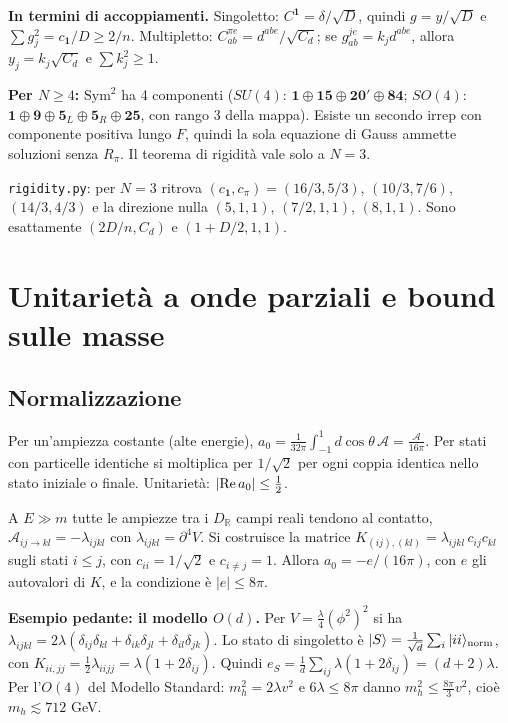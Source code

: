 \documentclass[11pt,a4paper]{article}
\numberwithin{equation}{section}
\theoremstyle{remark}
\newcommand{\R}{\mathbb{R}}
\begin{document}
\textbf{In termini di accoppiamenti.} Singoletto: $C^{\mathbf1}=\delta/\sqrt D$, quindi $g=y/\sqrt D$ e $\sum g_j^2=c_{\mathbf1}/D\ge2/n$. Multipletto: $C^{\pi e}_{ab}=d^{abe}/\sqrt{C_d}$; se $g^{je}_{ab}=k_jd^{abe}$, allora $y_j=k_j\sqrt{C_d}$ e $\sum k_j^2\ge1$.

\textbf{Per $N\ge4$:} $\mathrm{Sym}^2$ ha 4 componenti ($SU(4)$: $\mathbf1\oplus\mathbf{15}\oplus\mathbf{20}'\oplus\mathbf{84}$; $SO(4)$: $\mathbf1\oplus\mathbf9\oplus\mathbf5_L\oplus\mathbf5_R\oplus\mathbf{25}$, con rango 3 della mappa). Esiste un secondo irrep con componente positiva lungo $F$, quindi la sola equazione di Gauss ammette soluzioni senza $R_\pi$. Il teorema di rigidità vale solo a $N=3$.

\begin{verifica}
\texttt{rigidity.py}: per $N=3$ ritrova $(c_{\mathbf1},c_\pi)=(16/3,5/3)$, $(10/3,7/6)$, $(14/3,4/3)$ e la direzione nulla $(5,1,1)$, $(7/2,1,1)$, $(8,1,1)$. Sono esattamente $(2D/n,C_d)$ e $(1+D/2,1,1)$.
\end{verifica}

\section{Unitarietà a onde parziali e bound sulle masse}
\label{sec:unit}

\subsection{Normalizzazione}

Per un'ampiezza costante (alte energie), $a_0=\frac{1}{32\pi}\int_{-1}^1d\cos\theta\,\mathcal A=\frac{\mathcal A}{16\pi}$. Per stati con particelle identiche si moltiplica per $1/\sqrt2$ per ogni coppia identica nello stato iniziale o finale. Unitarietà: $|{\rm Re}\,a_0|\le\frac12$.

A $E\gg m$ tutte le ampiezze tra i $D_\R$ campi reali tendono al contatto, $\mathcal A_{ij\to kl}=-\lambda_{ijkl}$ con $\lambda_{ijkl}=\partial^4V$. Si costruisce la matrice $K_{(ij),(kl)}=\lambda_{ijkl}\,c_{ij}c_{kl}$ sugli stati $i\le j$, con $c_{ii}=1/\sqrt2$ e $c_{i\ne j}=1$. Allora $a_0=-e/(16\pi)$, con $e$ gli autovalori di $K$, e la condizione è $|e|\le8\pi$.

\textbf{Esempio pedante: il modello $O(d)$.} Per $V=\frac\lambda4(\phi^2)^2$ si ha $\lambda_{ijkl}=2\lambda(\delta_{ij}\delta_{kl}+\delta_{ik}\delta_{jl}+\delta_{il}\delta_{jk})$. Lo stato di singoletto è $|S\rangle=\frac{1}{\sqrt d}\sum_i|ii\rangle_{\rm norm}$, con $K_{ii,jj}=\frac12\lambda_{iijj}=\lambda(1+2\delta_{ij})$. Quindi $e_S=\frac1d\sum_{ij}\lambda(1+2\delta_{ij})=(d+2)\lambda$. Per l'$O(4)$ del Modello Standard: $m_h^2=2\lambda v^2$ e $6\lambda\le8\pi$ danno $m_h^2\le\frac{8\pi}{3}v^2$, cioè $m_h\lesssim712$ GeV. \checkmark
\end{document}

